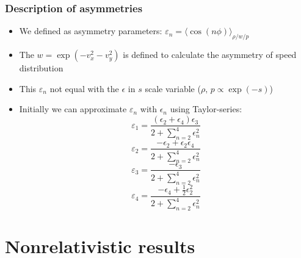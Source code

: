 \documentclass{beamer}
\begin{document}
\begin{frame}
\begin{center}
\begin{figure}[H]
\begin{subfigure}[b]{0.49\textwidth}
	\end{subfigure}
\end{figure}
\end{center}
\end{frame}

\section{}
\begin{frame}
\frametitle{Description of asymmetries}
\begin{itemize}
\item We defined as asymmetry parameters: $\varepsilon_n=\langle \cos(n\phi)\rangle_{\rho/w/p}$
\item The $w=\exp{(-v_x^2-v_y^2)}$ is defined to calculate the asymmetry of speed distribution
\item This $\varepsilon_n$ not equal with the $\epsilon$ in $s$ scale variable ($\rho,\,p \propto \exp{(-s)}$)
\item Initially we can approximate $\varepsilon_n$ with $\epsilon_n$ using Taylor-series:
\begin{equation}
\varepsilon_1=\frac{(\epsilon_2+\epsilon_4)\epsilon_3}{2+\sum_{n=2}^4\epsilon_n^2}
\end{equation}
\begin{equation}
\varepsilon_2=\frac{-\epsilon_2+\epsilon_2\epsilon_4}{2+\sum_{n=2}^4\epsilon_n^2}
\end{equation}
\begin{equation}
\varepsilon_3=\frac{-\epsilon_3}{2+\sum_{n=2}^4\epsilon_n^2}
\end{equation}
\begin{equation}
\varepsilon_4=\frac{-\epsilon_4+\frac{1}{2}\epsilon_2^2}{2+\sum_{n=2}^4\epsilon_n^2}
\end{equation}
\end{itemize}
\end{frame}

\section{Nonrelativistic results}
\end{document}
